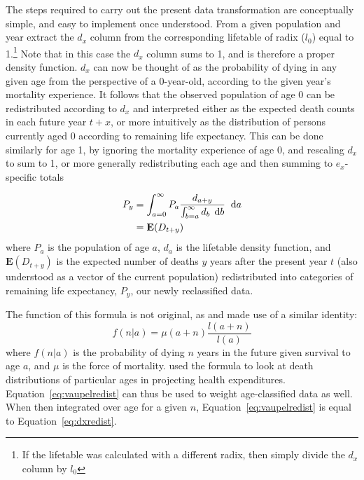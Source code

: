 \FloatBarrier
\label{sec:thetransformation}
The steps required to carry out the present data transformation are conceptually
simple, and easy to implement once understood. From a given
population and year extract the $d_x$ column from the corresponding lifetable of
radix ($l_0$) equal to 1.\footnote{If the lifetable was calculated with a
different radix, then simply divide the $d_x$ column by $l_0$} Note that in
this case the $d_x$ column sums to 1, and is therefore a proper density function. 
$d_x$ can now be thought of as the probability of dying in any given age from the
 perspective of a 0-year-old, according to the given year's mortality
 experience. It follows that the observed population of age 0 can be
 redistributed according to $d_x$ and interpreted either as the expected death
 counts in each future year
$t+x$, or more intuitively as the distribution of persons currently aged 0
according to remaining life expectancy. This can be done similarly for age 1, by ignoring the 
mortality experience of age 0, and rescaling $d_x$ to
sum to 1, or more generally redistributing each age and then summing to
$e_x$-specific totals

\begin{align}
\label{eq:dxredist}
P_{y} &= \int _{a = 0} ^{\infty} P_a \frac{d_{a + y}}{\int _{b
= a} ^{\infty} d_b\, \; \mathrm{d} b} \;\; \mathrm{d} a
\\
&= \mathbf{E}(D_{t+y}) \notag
\end{align}
where $P_a$ is the population of age $a$, $d_a$ is the
lifetable density function, and $\mathbf{E}(D_{t+y})$ is the expected number of
deaths $y$ years after the present year $t$ (also understood as a vector of the
current population) redistributed into categories of remaining life expectancy,
$P_{y}$, our newly reclassified data.

The function of this formula is not original, as
\citet{miller2001increasing} and \citet{vaupel2009life} made use of a similar
identity:
\begin{equation}
\label{eq:vaupelredist}
f(n | a) = \mu (a+n) \frac{l(a+n)}{l(a)}
\end{equation}
where $f(n | a) $ is the probability of dying $n$ years in the future given
survival to age $a$, and $\mu$ is the force of mortality.
\citet{miller2001increasing} used the formula to look at death distributions of
particular ages in projecting health expenditures.
Equation~\eqref{eq:vaupelredist} can thus be used to weight age-classified data
as well. When then integrated over age for a given $n$,
Equation~\eqref{eq:vaupelredist} is equal to Equation~\eqref{eq:dxredist}.

